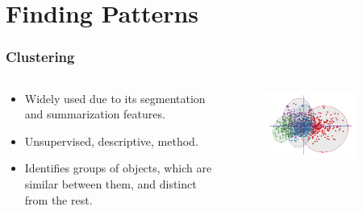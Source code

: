 \documentclass[hyperref={pdfpagelabels=true}]{beamer}
\begin{document}
\section{Finding Patterns} 
\begin{frame}
\frametitle{Clustering}
\begin{columns}
  \begin{column}{0.5\textwidth}\small{ 
    \begin{itemize}
      \item<1->Widely used due to its segmentation and summarization features.
      \item<2->Unsupervised, descriptive, method.
      \item<3->Identifies groups of objects, which are similar between them, and distinct from the rest.
      \end{itemize}  }
  \end{column}
  \begin{column}{0.5\textwidth}
      \begin{figure}  
	\includegraphics[width=0.8\textwidth]{Cluster_analysis.png}
       \end{figure}  
  \end{column}  
\end{columns}
\end{frame}
\end{document}
